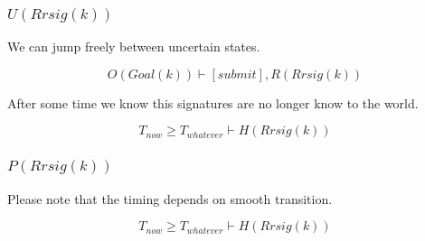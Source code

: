 \documentclass[twoside, a4paper]{article}
\newcommand{\highlightMinSig}[1]{\textcolor{MinSig}{\bf{#1}}}
\newcommand{\mathbox}[1]{#1}
\begin{document}
\subsubsection{$U(Rrsig(k))$}

\mathbox{

	We can jump freely between uncertain states.

	\begin{equation}
		O(Goal(k)) \vdash [submit], R(Rrsig(k))
	\end{equation}

	After some time we know this signatures are no longer know to the
	world.
	
	\begin{equation}
		T_{now} \geq T_{whatever} \vdash H(Rrsig(k))
	\end{equation}
}

\subsubsection{$P(Rrsig(k))$}

Please note that the timing depends on smooth transition.

\highlightMinSig{
	\begin{equation}
		T_{now} \geq T_{whatever} \vdash H(Rrsig(k))
	\end{equation}
}
\end{document}
